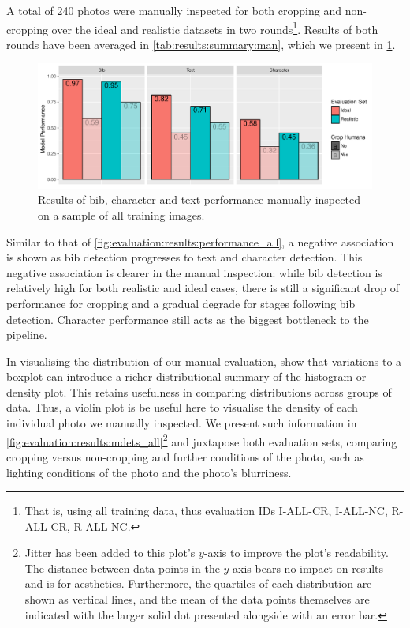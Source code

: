A total of 240 photos were manually inspected for both cropping and non-cropping over the ideal and realistic datasets in two rounds\footnote{That is, using all training data, thus evaluation IDs I-ALL-CR, I-ALL-NC, R-ALL-CR, R-ALL-NC.}. Results of both rounds have been averaged in \cref{tab:results:summary:man}, which we present in \cref{fig:evaluation:results:performance_man}.

\begin{figure}[h]
  \centering
  \includegraphics[width=1\textwidth]{images/evaluation/ManualSummary}
  \caption[Bib, text and character performance of manual inspection]{Results of bib, character and text performance manually inspected on a sample of all training images.}
  \label{fig:evaluation:results:performance_man}
\end{figure}

Similar to that of \cref{fig:evaluation:results:performance_all}, a negative association is shown as bib detection progresses to text and character detection. This negative association is clearer in the manual inspection: while bib detection is relatively high for both realistic and ideal cases, there is still a significant drop of performance for cropping and a gradual degrade for stages following bib detection. Character performance still acts as the biggest bottleneck to the pipeline.

In visualising the distribution of our manual evaluation, \citet{wickham:boxplots} show that variations to a boxplot can introduce a richer distributional summary of the histogram or density plot. This retains usefulness in comparing distributions across groups of data. Thus, a violin plot \citep{Hintze:1998fn} is be useful here to visualise the density of each individual photo we manually inspected. We present such information in \cref{fig:evaluation:results:mdets_all}\footnote{Jitter has been added to this plot's $y$-axis to improve the plot's readability. The distance between data points in the $y$-axis bears no impact on results and is for aesthetics. Furthermore, the quartiles of each distribution are shown as vertical lines, and the mean of the data points themselves are indicated with the larger solid dot presented alongside with an error bar.} and juxtapose both evaluation sets, comparing cropping versus non-cropping and further conditions of the photo, such as lighting conditions of the photo and the photo's blurriness.

